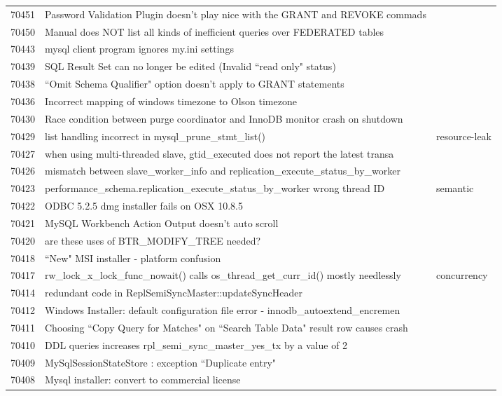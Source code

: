 \begin{longtable}[c]{p{1cm}p{10cm}p{1cm}}
70451 & Password Validation Plugin doesn't play nice with the GRANT and REVOKE commads &  \\
70450 & Manual does NOT list all kinds of inefficient queries over FEDERATED tables &  \\
70443 & mysql client program ignores my.ini settings &  \\
70439 & SQL Result Set can no longer be edited (Invalid ``read only" status) &  \\
70438 & ``Omit Schema Qualifier" option doesn't apply to GRANT statements &  \\
70436 & Incorrect mapping of windows timezone to Olson timezone &  \\
70430 & Race condition between purge coordinator and InnoDB monitor crash on shutdown &  \\
70429 & list handling incorrect in mysql\_prune\_stmt\_list() & resource-leak \\
70427 & when using multi-threaded slave, gtid\_executed does not report the latest transa &  \\
70426 & mismatch between slave\_worker\_info and replication\_execute\_status\_by\_worker &  \\
70423 & performance\_schema.replication\_execute\_status\_by\_worker wrong thread ID & semantic \\
70422 & ODBC 5.2.5 dmg installer fails on OSX 10.8.5 &  \\
70421 & MySQL Workbench Action Output doesn't auto scroll &  \\
70420 & are these uses of BTR\_MODIFY\_TREE needed? &  \\
70418 & ``New" MSI installer - platform confusion &  \\
70417 & rw\_lock\_x\_lock\_func\_nowait() calls os\_thread\_get\_curr\_id() mostly needlessly & concurrency \\
70414 & redundant code in ReplSemiSyncMaster::updateSyncHeader &  \\
70412 & Windows Installer: default configuration file error - innodb\_autoextend\_encremen &  \\
70411 & Choosing ``Copy Query for Matches" on ``Search Table Data" result row causes crash &  \\
70410 & DDL queries increases rpl\_semi\_sync\_master\_yes\_tx by a value of 2 &  \\
70409 & MySqlSessionStateStore : exception ``Duplicate entry" &  \\
70408 & Mysql installer: convert to commercial license &  \\

\end{longtable}
